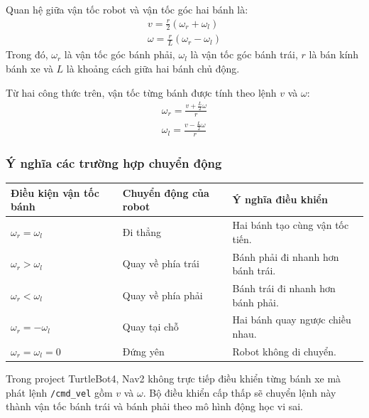Quan hệ giữa vận tốc robot và vận tốc góc hai bánh là:
\begin{gather*}v = \frac{r}{2}\left( \omega_{r} + \omega_{l} \right) \\[1.5ex]
\omega = \frac{r}{L}\left( \omega_{r} - \omega_{l} \right)\end{gather*}
Trong đó, \(\omega_{r}\) là vận tốc góc bánh phải, \(\omega_{l}\) là vận
tốc góc bánh trái, \(r\) là bán kính bánh xe và \(L\) là khoảng cách
giữa hai bánh chủ động.

Từ hai công thức trên, vận tốc từng bánh được tính theo lệnh \(v\) và
\(\omega\):
\begin{gather*}\omega_{r} = \frac{v + \frac{L}{2}\omega}{r} \\[1.5ex]
\omega_{l} = \frac{v - \frac{L}{2}\omega}{r}\end{gather*}
\subsubsection{Ý nghĩa các trường hợp chuyển động}

\renewcommand{\arraystretch}{1.25}
\begin{longtable}{|
  >{\raggedright\arraybackslash}p{}|
  >{\raggedright\arraybackslash}p{}|
  >{\raggedright\arraybackslash}p{}|}
\hline
\textbf{Điều kiện vận tốc bánh} & \textbf{Chuyển động của robot} & \textbf{Ý nghĩa điều khiển} \\ \hline
\hline
\endhead
\hline
\endlastfoot
\(\omega_{r} = \omega_{l}\) & Đi thẳng & Hai bánh tạo cùng vận tốc
tiến. \\ \hline
\(\omega_{r} > \omega_{l}\) & Quay về phía trái & Bánh phải đi nhanh hơn
bánh trái. \\ \hline
\(\omega_{r} < \omega_{l}\) & Quay về phía phải & Bánh trái đi nhanh hơn
bánh phải. \\ \hline
\(\omega_{r} = - \omega_{l}\) & Quay tại chỗ & Hai bánh quay ngược chiều
nhau. \\ \hline
\(\omega_{r} = \omega_{l} = 0\) & Đứng yên & Robot không di chuyển. \\ \hline
\end{longtable}

Trong project TurtleBot4, Nav2 không trực tiếp điều khiển từng bánh xe
mà phát lệnh \texttt{/cmd\_vel} gồm \(v\) và \(\omega\). Bộ điều khiển
cấp thấp sẽ chuyển lệnh này thành vận tốc bánh trái và bánh phải theo mô
hình động học vi sai.

